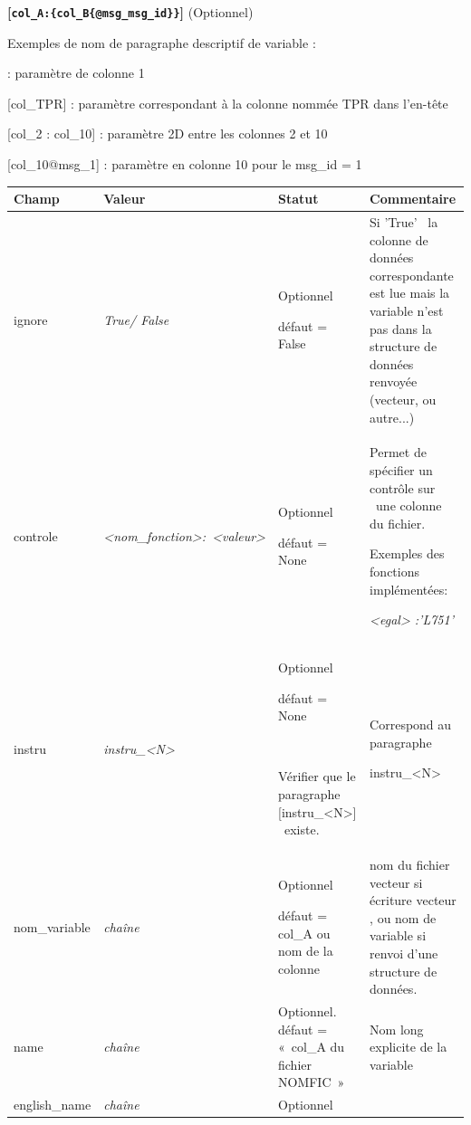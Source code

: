 {\medskip
\large      \color{blue}\textbf{[\texttt{col\_A:\{col\_B\{@msg\_msg\_id\}\}}]}
\normalsize \color{black} (Optionnel)

\medskip
Exemples de nom de paragraphe descriptif de variable :

\medskip
[col\_1] : paramètre de colonne 1

[col\_TPR] : paramètre correspondant à la colonne nommée TPR dans l'en-tête

[col\_2 : col\_10] : paramètre 2D entre les colonnes 2 et 10

[col\_10@msg\_1] : paramètre en colonne 10 pour le msg\_id = 1

\medskip
\begin{center}
\tablefirsthead{}
\tabletail{\hline}
\tablelasttail{}
\begin{supertabular}{|p{2.9099998cm}|p{3.783cm}|p{4.058cm}|p{4.4500003cm}|}
\hline
{\bfseries\color{black} Champ} &
{\bfseries\color{black} Valeur} &
{\bfseries\color{black} Statut} &
{\bfseries\color{black} Commentaire}\\\hline
ignore  &
{\itshape True/ False} &
Optionnel

défaut = False &
Si 'True' \ la colonne de données correspondante est lue mais la variable n'est pas dans la structure de données
renvoyée (vecteur, ou autre...)\\\hline
{\color{black} controle } &
{\color{black} \textit{{\textless}nom\_fonction{\textgreater}:~{\textless}valeur{\textgreater}}} &
Optionnel

défaut = None &
Permet de spécifier un contrôle sur \ une colonne du fichier. 

Exemples des fonctions implémentées:

{\itshape {\textless}egal{\textgreater} :{}'L751'}\\\hline
instru &
{\itshape instru\_{\textless}N{\textgreater}} &
Optionnel

défaut = None

~

Vérifier que le paragraphe [instru\_{\textless}N{\textgreater}] \ existe. &
Correspond au paragraphe 

instru\_{\textless}N{\textgreater}\\\hline
nom\_variable &
{\itshape chaîne} &
Optionnel

défaut = col\_A ou nom de la colonne &
nom du fichier vecteur si écriture vecteur , ou nom de variable si renvoi d'une structure de données.\\\hline
name &
{\itshape chaîne} &
Optionnel.\newline
défaut = «~col\_A du fichier NOMFIC~» &
Nom long explicite de la variable\\\hline
english\_name &
{\itshape chaîne} &
Optionnel


\end{supertabular}
\end{center}}
